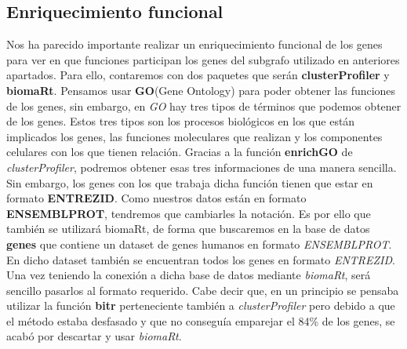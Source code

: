 \subsection{Enriquecimiento funcional}
Nos ha parecido importante realizar un enriquecimiento funcional de los genes para ver en que funciones participan los genes del subgrafo utilizado en anteriores apartados.\newline
Para ello, contaremos con dos paquetes que ser\'an \textbf{clusterProfiler} y \textbf{biomaRt}. Pensamos usar \textbf{GO}(Gene Ontology) para poder obtener las funciones de los genes, sin embargo, en \textit{GO} hay tres tipos de t\'erminos que podemos obtener de los genes. Estos tres tipos son los procesos biol\'ogicos en los que est\'an implicados los genes, las funciones moleculares que realizan y los componentes celulares con los que tienen relaci\'on.\newline
Gracias a la funci\'on \textbf{enrichGO} de \textit{clusterProfiler}, podremos obtener esas tres informaciones de una manera sencilla. Sin embargo, los genes con los que trabaja dicha funci\'on tienen que estar en formato \textbf{ENTREZID}.\newline
Como nuestros datos est\'an en formato \textbf{ENSEMBLPROT}, tendremos que cambiarles la notaci\'on. Es por ello que tambi\'en se utilizar\'a biomaRt, de forma que buscaremos en la base de datos \textbf{genes} que contiene un dataset de genes humanos en formato \textit{ENSEMBLPROT}. En dicho dataset tambi\'en se encuentran todos los genes en formato \textit{ENTREZID}. Una vez teniendo la conexi\'on a dicha base de datos mediante \textit{biomaRt}, ser\'a sencillo pasarlos al formato requerido.\newline
Cabe decir que, en un principio se pensaba utilizar la funci\'on \textbf{bitr} perteneciente tambi\'en a \textit{clusterProfiler} pero debido a que el m\'etodo estaba desfasado y que no consegu\'ia emparejar el 84\% de los genes, se acab\'o por descartar y usar \textit{biomaRt}.
